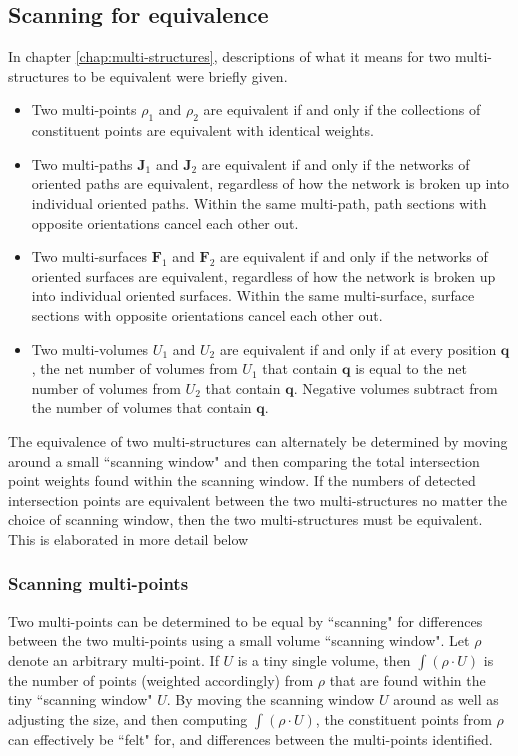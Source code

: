 \documentclass{book}
\begin{document}
\subsection{Scanning for equivalence}

In chapter \ref{chap:multi-structures}, descriptions of what it means for two multi-structures to be equivalent were briefly given. 

\begin{itemize}
\item Two multi-points \(\rho_1\) and \(\rho_2\) are equivalent if and only if the collections of constituent points are equivalent with identical weights. 
\item Two multi-paths \(\mathbf{J}_1\) and \(\mathbf{J}_2\) are equivalent if and only if the networks of oriented paths are equivalent, regardless of how the network is broken up into individual oriented paths. Within the same multi-path, path sections with opposite orientations cancel each other out. 
\item Two multi-surfaces \(\mathbf{F}_1\) and \(\mathbf{F}_2\) are equivalent if and only if the networks of oriented surfaces are equivalent, regardless of how the network is broken up into individual oriented surfaces. Within the same multi-surface, surface sections with opposite orientations cancel each other out. 
\item Two multi-volumes \(U_1\) and \(U_2\) are equivalent if and only if at every position \(\mathbf{q}\), the net number of volumes from \(U_1\) that contain \(\mathbf{q}\) is equal to the net number of volumes from \(U_2\) that contain \(\mathbf{q}\). Negative volumes subtract from the number of volumes that contain \(\mathbf{q}\). 
\end{itemize}

The equivalence of two multi-structures can alternately be determined by moving around a small ``scanning window" and then comparing the total intersection point weights found within the scanning window. If the numbers of detected intersection points are equivalent between the two multi-structures no matter the choice of scanning window, then the two multi-structures must be equivalent. This is elaborated in more detail below

\subsubsection{Scanning multi-points}

Two multi-points can be determined to be equal by ``scanning" for differences between the two multi-points using a small volume ``scanning window". Let \(\rho\) denote an arbitrary multi-point. If \(U\) is a tiny single volume, then \(\int (\rho \cdot U)\) is the number of points (weighted accordingly) from \(\rho\) that are found within the tiny ``scanning window" \(U\). By moving the scanning window \(U\) around as well as adjusting the size, and then computing \(\int (\rho \cdot U)\), the constituent points from \(\rho\) can effectively be ``felt" for, and differences between the multi-points identified.  
\end{document}
